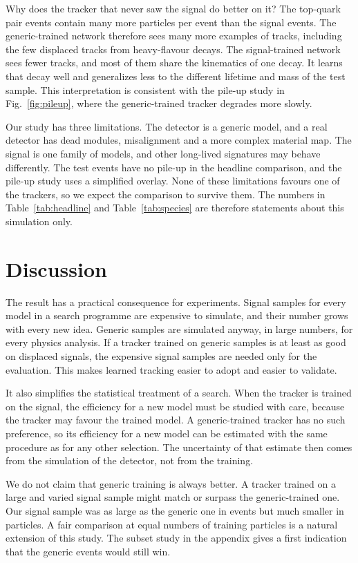 Why does the tracker that never saw the signal do better on it? The top-quark pair events contain
many more particles per event than the signal events. The generic-trained network therefore sees
many more examples of tracks, including the few displaced tracks from heavy-flavour decays. The
signal-trained network sees fewer tracks, and most of them share the kinematics of one decay. It
learns that decay well and generalizes less to the different lifetime and mass of the test sample.
This interpretation is consistent with the pile-up study in Fig.~\ref{fig:pileup}, where the
generic-trained tracker degrades more slowly.

Our study has three limitations. The detector is a generic model, and a real detector has dead
modules, misalignment and a more complex material map. The signal is one family of models, and other
long-lived signatures may behave differently. The test events have no pile-up in the headline
comparison, and the pile-up study uses a simplified overlay. None of these limitations favours one
of the trackers, so we expect the comparison to survive them. The numbers in
Table~\ref{tab:headline} and Table~\ref{tab:species} are therefore statements about this simulation
only.

\section{Discussion}
\label{sec:discussion}

The result has a practical consequence for experiments. Signal samples for every model in a search
programme are expensive to simulate, and their number grows with every new idea. Generic samples are
simulated anyway, in large numbers, for every physics analysis. If a tracker trained on generic
samples is at least as good on displaced signals, the expensive signal samples are needed only for
the evaluation. This makes learned tracking easier to adopt and easier to validate.

It also simplifies the statistical treatment of a search. When the tracker is trained on the signal,
the efficiency for a new model must be studied with care, because the tracker may favour the trained
model. A generic-trained tracker has no such preference, so its efficiency for a new model can be
estimated with the same procedure as for any other selection. The uncertainty of that estimate then
comes from the simulation of the detector, not from the training.

We do not claim that generic training is always better. A tracker trained on a large and varied
signal sample might match or surpass the generic-trained one. Our signal sample was as large as the
generic one in events but much smaller in particles. A fair comparison at equal numbers of training
particles is a natural extension of this study. The subset study in the appendix gives a first
indication that the generic events would still win.

